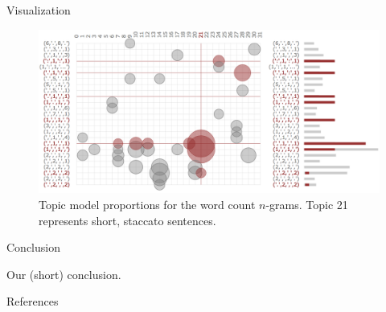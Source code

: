 \documentclass[final]{beamer}
\newlength{\onecolwid}
\begin{document}
\begin{frame}[t]
\begin{columns}[t]
\begin{column}{\onecolwid} %


\begin{block}{Visualization}

\begin{figure}
\centering
\includegraphics[width=\linewidth]{termite.png}
\caption{Topic model proportions for the word count $n$-grams. Topic 21 represents short, staccato sentences.}
\end{figure}

\end{block}


\begin{block}{Conclusion}

Our (short) conclusion.

\end{block}



\begin{block}{References}
\small



\end{block}


\end{column}
\end{columns}
\end{frame}
\end{document}
